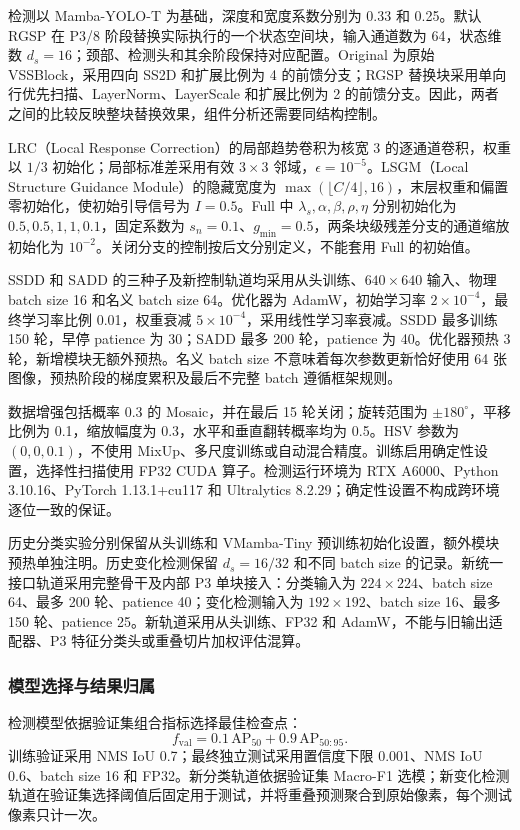 \documentclass[journal]{IEEEtran}
\begin{document}
检测以 Mamba-YOLO-T 为基础，深度和宽度系数分别为 0.33 和 0.25。默认 RGSP 在 P3/8 阶段替换实际执行的一个状态空间块，输入通道数为 64，状态维数 $d_s=16$；颈部、检测头和其余阶段保持对应配置。Original 为原始 VSSBlock，采用四向 SS2D 和扩展比例为 4 的前馈分支；RGSP 替换块采用单向行优先扫描、LayerNorm、LayerScale 和扩展比例为 2 的前馈分支。因此，两者之间的比较反映整块替换效果，组件分析还需要同结构控制。

LRC（Local Response Correction）的局部趋势卷积为核宽 3 的逐通道卷积，权重以 $1/3$ 初始化；局部标准差采用有效 $3\times3$ 邻域，$\epsilon=10^{-5}$。LSGM（Local Structure Guidance Module）的隐藏宽度为 $\max(\lfloor C/4\rfloor,16)$，末层权重和偏置零初始化，使初始引导信号为 $I=0.5$。Full 中 $\lambda_s,\alpha,\beta,\rho,\eta$ 分别初始化为 $0.5,0.5,1,1,0.1$，固定系数为 $s_n=0.1$、$g_{\min}=0.5$，两条块级残差分支的通道缩放初始化为 $10^{-2}$。关闭分支的控制按后文分别定义，不能套用 Full 的初始值。

SSDD 和 SADD 的三种子及新控制轨道均采用从头训练、$640\times640$ 输入、物理 batch size 16 和名义 batch size 64。优化器为 AdamW，初始学习率 $2\times10^{-4}$，最终学习率比例 0.01，权重衰减 $5\times10^{-4}$，采用线性学习率衰减。SSDD 最多训练 150 轮，早停 patience 为 30；SADD 最多 200 轮，patience 为 40。优化器预热 3 轮，新增模块无额外预热。名义 batch size 不意味着每次参数更新恰好使用 64 张图像，预热阶段的梯度累积及最后不完整 batch 遵循框架规则。

数据增强包括概率 0.3 的 Mosaic，并在最后 15 轮关闭；旋转范围为 $\pm180^\circ$，平移比例为 0.1，缩放幅度为 0.3，水平和垂直翻转概率均为 0.5。HSV 参数为 $(0,0,0.1)$，不使用 MixUp、多尺度训练或自动混合精度。训练启用确定性设置，选择性扫描使用 FP32 CUDA 算子。检测运行环境为 RTX A6000、Python 3.10.16、PyTorch 1.13.1+cu117 和 Ultralytics 8.2.29；确定性设置不构成跨环境逐位一致的保证。

历史分类实验分别保留从头训练和 VMamba-Tiny 预训练初始化设置，额外模块预热单独注明。历史变化检测保留 $d_s=16/32$ 和不同 batch size 的记录。新统一接口轨道采用完整骨干及内部 P3 单块接入：分类输入为 $224\times224$、batch size 64、最多 200 轮、patience 40；变化检测输入为 $192\times192$、batch size 16、最多 150 轮、patience 25。新轨道采用从头训练、FP32 和 AdamW，不能与旧输出适配器、P3 特征分类头或重叠切片加权评估混算。

\subsubsection{模型选择与结果归属}

检测模型依据验证集组合指标选择最佳检查点：
\begin{equation}
f_{\mathrm{val}}
=0.1\,\mathrm{AP}_{50}
+0.9\,\mathrm{AP}_{50:95}.
\label{eq:selection_fitness}
\end{equation}
训练验证采用 NMS IoU 0.7；最终独立测试采用置信度下限 0.001、NMS IoU 0.6、batch size 16 和 FP32。新分类轨道依据验证集 Macro-F1 选模；新变化检测轨道在验证集选择阈值后固定用于测试，并将重叠预测聚合到原始像素，每个测试像素只计一次。
\end{document}
